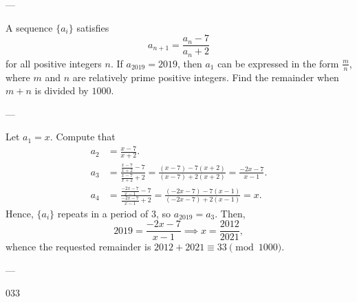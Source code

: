 
---

A sequence $\{a_i\}$ satisfies \[a_{n+1}=\frac{a_n-7}{a_n+2}\]
for all positive integers $n$. If $a_{2019}=2019$, then $a_1$ can be expressed in the form $\tfrac mn$, where $m$ and $n$ are relatively prime positive integers. Find the remainder when $m+n$ is divided by $1000$.

---

Let $a_1=x$. Compute that
\begin{align*}
    a_2&=\frac{x-7}{x+2}.\\
    a_3&=\frac{\frac{x-7}{x+2}-7}{\frac{x-7}{x+2}+2}=\frac{(x-7)-7(x+2)}{(x-7)+2(x+2)}=\frac{-2x-7}{x-1}.\\
    a_4&=\frac{\frac{-2x-7}{x-1}-7}{\frac{-2x-7}{x-1}+2}=\frac{(-2x-7)-7(x-1)}{(-2x-7)+2(x-1)}=x.
\end{align*}
Hence, $\{a_i\}$ repeats in a period of $3$, so $a_{2019}=a_3$. Then, \[2019=\frac{-2x-7}{x-1}\implies x=\frac{2012}{2021},\]
whence the requested remainder is $2012+2021\equiv 33\pmod{1000}$.

---

033
